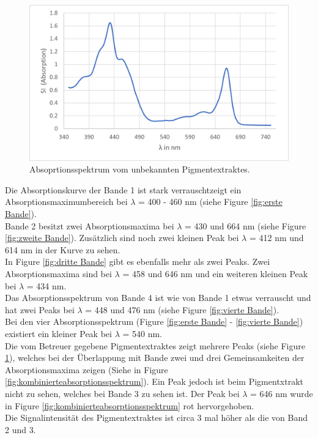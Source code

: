 \documentclass[10pt,a4paper]{article}
\begin{document}
			\begin{figure}[H]
				\centering
				\includegraphics[scale=1]{fifthband.png}
				\caption{Absoprtionsspektrum vom unbekannten Pigmentextraktes.}
				\label{fig:fünfte Bande}
			\end{figure}
			
			Die Absorptionskurve der Bande 1 ist stark verrauschtzeigt ein Absorptionsmaximumbereich bei $\lambda$ = 400 - 460 nm (siehe Figure \ref{fig:erste Bande}).\\
			Bande 2 besitzt zwei Absorptionsmaxima bei $\lambda$ = 430 und 664 nm (siehe Figure \ref{fig:zweite Bande}). Zusätzlich sind noch zwei kleinen Peak bei  $\lambda$ = 412 nm und 614 nm in der Kurve zu sehen.\\
			In Figure \ref{fig:dritte Bande}  gibt es ebenfalls mehr als zwei Peaks. Zwei Absorptionsmaxima sind bei $\lambda$ = 458 und 646 nm und ein weiteren kleinen Peak bei $\lambda$ = 434 nm.\\
			Das Absorptionsspektrum von Bande 4 ist wie von Bande 1 etwas verrauscht und hat zwei Peaks bei $\lambda$ = 448 und 476 nm (siehe Figure \ref{fig:vierte Bande}).\\
			Bei den vier Absorptionsspektrum (Figure \ref{fig:erste Bande} - \ref{fig:vierte Bande}) existiert ein kleiner Peak bei $\lambda$ = 540 nm.\\
			Die vom Betreuer gegebene Pigmentextraktes zeigt mehrere Peaks (siehe Figure \ref{fig:fünfte Bande}), welches bei der Überlappung mit Bande zwei und drei Gemeinsamkeiten der Absorptionsmaxima zeigen (Siehe in Figure \ref{fig:kombinierteabsorptionsspektrum}). Ein Peak jedoch ist beim Pigmentxtrakt nicht zu sehen, welches bei Bande 3 zu sehen ist. Der Peak bei $\lambda$ = 646 nm wurde in Figure \ref{fig:kombinierteabsorptionsspektrum} rot hervorgehoben.\\
			Die Signalintensität des Pigmentextraktes ist circa 3 mal höher als die von Band 2 und 3.
			
\end{document}
